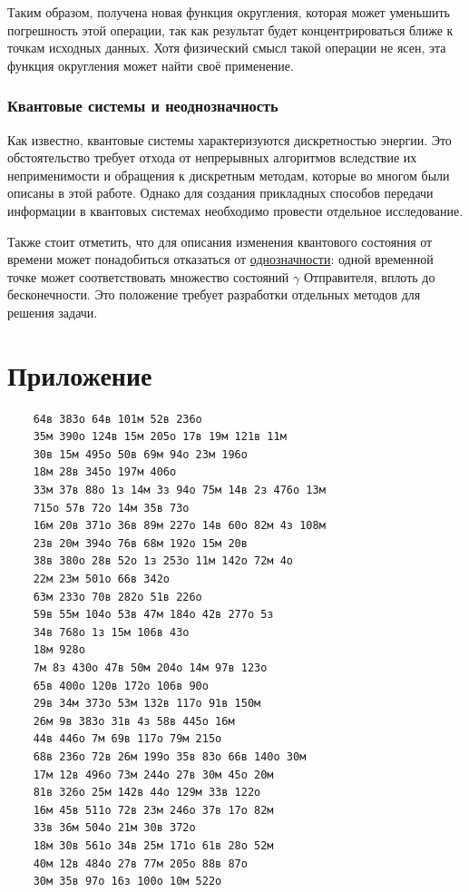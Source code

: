 \documentclass[12pt]{report}
\begin{document}
Таким образом, получена новая функция округления, которая может уменьшить погрешность этой операции, так как результат будет концентрироваться ближе к точкам исходных данных. Хотя физический смысл такой операции не ясен, эта функция округления может найти своё применение.

\subsubsection{Квантовые системы и неоднозначность}
Как известно, квантовые системы характеризуются дискретностью энергии. Это обстоятельство требует отхода от непрерывных алгоритмов вследствие их неприменимости и обращения к дискретным методам, которые во многом были описаны в этой работе. Однако для создания прикладных способов передачи информации в квантовых системах необходимо провести отдельное исследование.

Также стоит отметить, что для описания изменения квантового состояния от времени может понадобиться отказаться от \hyperref[sec:def]{однозначности}: одной временной точке может соответствовать множество состояний $\gamma$ Отправителя, вплоть до бесконечности. Это положение требует разработки отдельных методов для решения задачи.

\section{Приложение}
\label{sec:attach}
\begin{verbatim}
    64в 383о 64в 101м 52в 236о
    35м 390о 124в 15м 205о 17в 19м 121в 11м
    30в 15м 495о 50в 69м 94о 23м 196о
    18м 28в 345о 197м 406о
    33м 37в 88о 1з 14м 3з 94о 75м 14в 2з 476о 13м
    715о 57в 72о 14м 35в 73о
    16м 20в 371о 36в 89м 227о 14в 60о 82м 4з 108м
    23в 20м 394о 76в 68м 192о 15м 20в
    38в 380о 28в 52о 1з 253о 11м 142о 72м 4о
    22м 23м 501о 66в 342о
    63м 233о 70в 282о 51в 226о
    59в 55м 104о 53в 47м 184о 42в 277о 5з
    34в 768о 1з 15м 106в 43о
    18м 928о
    7м 8з 430о 47в 50м 204о 14м 97в 123о
    65в 400о 120в 172о 106в 90о
    29в 34м 373о 53м 132в 117о 91в 150м
    26м 9в 383о 31в 4з 58в 445о 16м
    44в 446о 7м 69в 117о 79м 215о
    68в 236о 72в 26м 199о 35в 83о 66в 140о 30м
    17м 12в 496о 73м 244о 27в 30м 45о 20м
    81в 326о 25м 142в 44о 129м 33в 122о
    16м 45в 511о 72в 23м 246о 37в 17о 82м
    33в 36м 504о 21м 30в 372о
    18м 30в 561о 34в 25м 171о 61в 28о 52м
    40м 12в 484о 27в 77м 205о 88в 87о
    30м 35в 97о 16з 100о 10м 522о
\end{verbatim}
\end{document}
